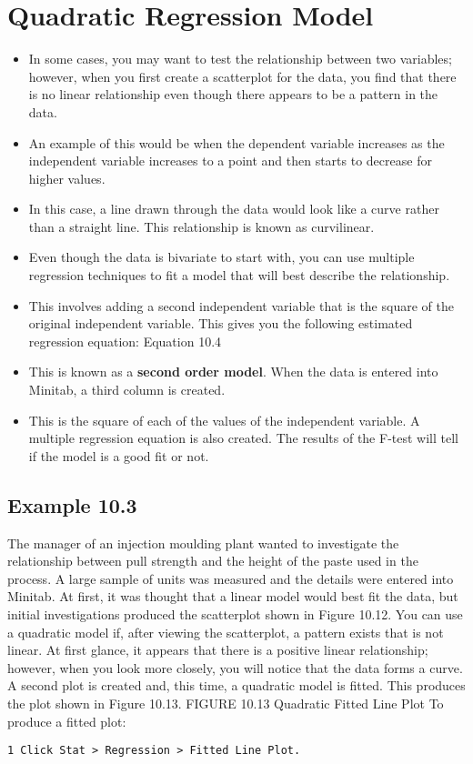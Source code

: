 \documentclass[]{report}
\begin{document}
\section*{Quadratic Regression Model}
\begin{itemize}
	\item In some cases, you may want to test the relationship between two variables; however,
	when you first create a scatterplot for the data, you find that there is no linear
	relationship even though there appears to be a pattern in the data.
	\item  An example of this
	would be when the dependent variable increases as the independent variable increases
	to a point and then starts to decrease for higher values. 
	\item In this case, a line drawn
	through the data would look like a curve rather than a straight line. This relationship
	is known as curvilinear.
	
\item Even though the data is bivariate to start with, you can use multiple regression
	techniques to fit a model that will best describe the relationship.
	\item  This involves adding
	a second independent variable that is the square of the original independent variable.
	This gives you the following estimated regression equation:
	Equation 10.4
	
\item This is known as a \textbf{second order model}. When the data is entered into Minitab, a third
	column is created. 
\item This is the square of each of the values of the independent variable.
	A multiple regression equation is also created. The results of the F-test will tell if the
	model is a good fit or not.
	
\end{itemize}
\newpage
\subsection*{Example 10.3}
The manager of an injection moulding plant wanted to investigate the relationship
between pull strength and the height of the paste used in the process. A large sample
of units was measured and the details were entered into Minitab. At first, it was thought
that a linear model would best fit the data, but initial investigations produced the
scatterplot shown in Figure 10.12.
You can use a quadratic model if, after viewing the scatterplot, a
pattern exists that is not linear.
At first glance, it appears that there is a positive linear relationship; however, when
you look more closely, you will notice that the data forms a curve. A second plot is
created and, this time, a quadratic model is fitted. This produces the plot shown in
Figure 10.13.
FIGURE 10.13 Quadratic Fitted Line Plot
To produce a fitted plot:
\begin{verbatim}
1 Click Stat > Regression > Fitted Line Plot.
\end{verbatim}
\end{document}
